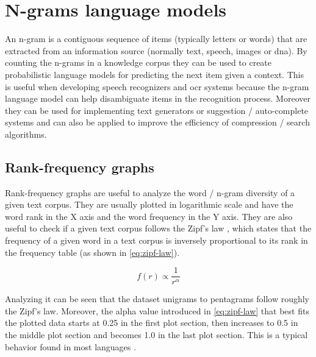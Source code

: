 \section{N-grams language models}\label{sec:n-grams}

An n-gram is a contiguous sequence of items (typically letters or words) that are extracted from an information source (normally text, speech, images or \gls{dna}). By counting the n-grams in a knowledge corpus they can be used to create probabilistic language models for predicting the next item given a context. This is useful when developing speech recognizers and \gls{ocr} systems because the n-gram language model can help disambiguate items in the recognition process. Moreover they can be used for implementing text generators or suggestion / auto-complete systems and can also be applied to improve the efficiency of compression / search algorithms.



\subsection{Rank-frequency graphs}

Rank-frequency graphs are useful to analyze the word / n-gram diversity of a given text corpus. They are usually plotted in logarithmic scale and have the word rank in the X axis and the word frequency in the Y axis. They are also useful to check if a given text corpus follows the Zipf's law \cite{Piantadosi2014}, which states that the frequency of a given word in a text corpus is inversely proportional to its rank in the frequency table (as shown in \cref{eq:zipf-law}).

\begin{equation}\label{eq:zipf-law}
f(r) \propto \frac{1}{r^\alpha}
\end{equation}

Analyzing  it can be seen that the dataset unigrams to pentagrams follow roughly the Zipf's law. Moreover, the alpha value introduced in \cref{eq:zipf-law} that best fits the plotted data starts at 0.25 in the first plot section, then increases to 0.5 in the middle plot section and becomes 1.0 in the last plot section. This is a typical behavior found in most languages \cite{NemethZainko2003}.

